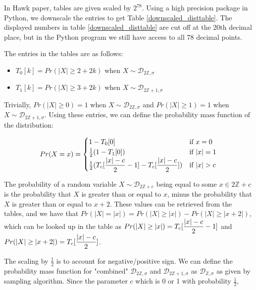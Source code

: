 \documentclass[12 pt]{article}        	%
\newcommand{\bb}[1]{\mathbb{#1}}
\newcommand{\dgd}{\mathcal{D}}
\begin{document}
In Hawk paper, tables are given scaled by $2^{78}$. Using a high precision package in Python, we downscale the entries to get
Table \ref{downscaled_disttable}. The displayed numbers in table \ref{downscaled_disttable} are cut off at the 20th decimal place, but in the Python program we still have access to all 78 decimal points.

The entries in the tables are as follows: 
\begin{itemize}
    \item $T_0[k] = Pr(|X| \geq 2 + 2k)$ when $X \sim \dgd_{2\bb{Z}, \sigma}$
    \item $T_1[k] = Pr(|X| \geq 3 + 2k)$ when $X \sim \dgd_{2\bb{Z} + 1, \sigma}$
\end{itemize}
Trivially, $Pr(|X| \geq 0) = 1$ when $X \sim \dgd_{2\bb{Z}, \sigma}$ and $Pr(|X| \geq 1) = 1$ when $X \sim \dgd_{2\bb{Z} + 1, \sigma}$.
Using these entries, we can define the probability mass function of the distribution:

\[
    Pr(X=x) = 
\begin{cases}
    1 - T_0[0] & \text{if } x = 0 \\
    \frac{1}{2} (1 - T_1[0]) & \text{if } \lvert x \rvert = 1 \\
    \frac{1}{2}\mathlarger{(T_c[\frac{\lvert x \rvert - c}{2} - 1] - T_c[\frac{\lvert x \rvert - c}{2}])} & \text{if } \lvert x \rvert > c
\end{cases}
\]

The probability of a random variable $X \sim \dgd_{2\bb{Z} + c}$ being equal to some $x \in 2\bb{Z} + c$ is the probability that $X$ is greater than or equal to $x$, minus the probability that $X$ is greater than or equal to $x + 2$.
These values can be retrieved from the tables, and we have that $Pr(|X| = |x|) = Pr(|X| \geq |x|) - Pr(|X| \geq |x+2|)$, which can be looked up in the table as $Pr(|X| \geq |x|) = \mathlarger{T_c[\frac{\lvert x \rvert - c}{2} - 1]}$
and $Pr(|X| \geq |x+2|) = \mathlarger{T_c[\frac{\lvert x \rvert - c}{2}]}$.

The scaling by $\frac{1}{2}$ is to account for negative/positive sign. 
We can define the probability mass function for "combined" $\dgd_{2\bb{Z}, \sigma}$ and $\dgd_{2\bb{Z} + 1, \sigma}$ as $\dgd_{\bb{Z}, \sigma}$ as given by sampling algorithm. 
Since the parameter $c$ which is 0 or 1 with probability $\frac{1}{2}$, 
\end{document}
